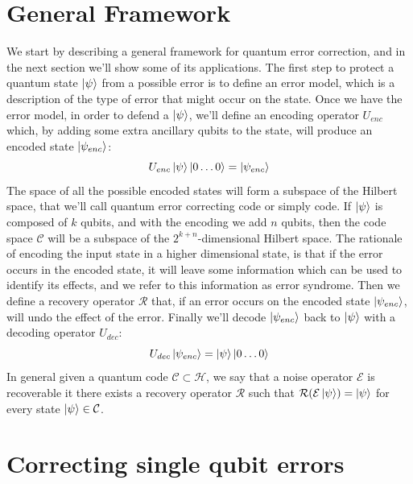 \documentclass{article}
\begin{document}
	\section{General Framework}
	We start by describing a general framework for quantum error correction, and in the next section we'll show some of its applications. The first step to protect a quantum state $\ket{\psi}$ from a possible error is to define an error model, which is a description of the type of error that might occur on the state. Once we have the error model, in order to defend a $\ket{\psi}$, we'll define an encoding operator $U_{enc}$ which, by adding some extra ancillary qubits to the state, will produce an encoded state $\ket{\psi_{enc}}$:
	\[ U_{enc}\ket{\psi}\ket{0\dots0} = \ket{\psi_{enc}} \]
	The space of all the possible encoded states will form a subspace of the Hilbert space, that we'll call quantum error correcting code or simply code. If $\ket{\psi}$ is composed of $k$ qubits, and with the encoding we add $n$ qubits, then the code space $\mathcal{C}$ will be a subspace of the $2^{k+n}$-dimensional Hilbert space. The rationale of encoding the input state in a higher dimensional state, is that if the error occurs in the encoded state, it will leave some information which can be used to identify its effects, and we refer to this information as error syndrome. Then we define a recovery operator $\mathcal{R}$ that, if an error occurs on the encoded state $\ket{\psi_{enc}}$, will undo the effect of the error. Finally we'll decode $\ket{\psi_{enc}}$ back to $\ket{\psi}$ with a decoding operator $U_{dec}$:
	\[U_{dec}\ket{\psi_{enc}} = \ket{\psi}\ket{0\dots0}\]
	In general given a quantum code $\mathcal{C} \subset \mathcal{H}$, we say that a noise operator $\mathcal{E}$ is recoverable it there exists a recovery operator $\mathcal{R}$ such that $\mathcal{R(\mathcal{E}\ket{\psi})} = \ket{\psi}$ for every state $\ket{\psi} \in \mathcal{C}$.
	\section{Correcting single qubit errors}
\end{document}
